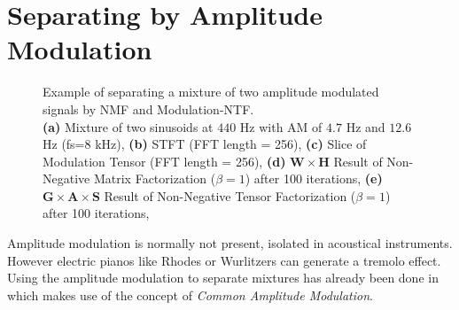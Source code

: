 \section{Separating by Amplitude Modulation}
\label{sub:am}

\begin{figure}[H]
    \centering
    \tiny
    \hfill
    \subfloat[Spectrogram]{
    }%
    \hfill

    \subfloat[NMF]{
    }\hfill
    \hfill
    \caption{Example of separating a mixture of two amplitude modulated signals by NMF and Modulation-NTF. \\ \textbf{(a)} Mixture of two sinusoids at $440$ Hz with AM of $4.7$ Hz and $12.6$ Hz (fs=$8$ kHz), \textbf{(b)} STFT (FFT length = 256), \textbf{(c)} Slice of Modulation Tensor (FFT length = 256),  \textbf{(d)} $\mathbf{W} \times \mathbf{H}$ Result of Non-Negative Matrix Factorization ($\beta = 1$) after 100 iterations, \textbf{(e)}  $\mathbf{G} \times \mathbf{A} \times \mathbf{S} $ Result of Non-Negative Tensor Factorization ($\beta = 1$) after 100 iterations,}
    \label{fig:tensor}
\end{figure}

Amplitude modulation is normally not present, isolated in acoustical instruments. However electric pianos like Rhodes or Wurlitzers can generate a tremolo effect. Using the amplitude modulation to separate mixtures has already been done in \cite{li09} which makes use of the concept of \emph{Common Amplitude Modulation}.

